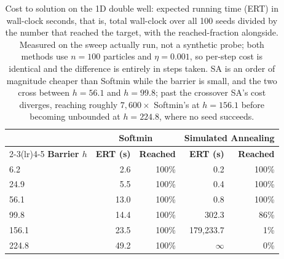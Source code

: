 \documentclass{article} %
\theoremstyle{plain}
\theoremstyle{definition}
\theoremstyle{remark}
\begin{document}
\begin{table}[!htbp]
\centering
\caption{Cost to solution on the 1D double well: expected running time (ERT) in wall-clock seconds, that is, total wall-clock over all 100 seeds divided by the number that reached the target, with the reached-fraction alongside. Measured on the sweep actually run, not a synthetic probe; both methods use $n=100$ particles and $\eta=0.001$, so per-step cost is identical and the difference is entirely in steps taken. SA is an order of magnitude cheaper than Softmin while the barrier is small, and the two cross between $h=56.1$ and $h=99.8$; past the crossover SA's cost diverges, reaching roughly $7{,}600\times$ Softmin's at $h=156.1$ before becoming unbounded at $h=224.8$, where no seed succeeds.}
\label{tab:cost_to_solution}
\begin{tabular}{@{}lrrrr@{}}
\toprule
& \multicolumn{2}{c}{\textbf{Softmin}} & \multicolumn{2}{c}{\textbf{Simulated Annealing}} \\
\cmidrule(lr){2-3}\cmidrule(lr){4-5}
\textbf{Barrier $h$} & \textbf{ERT (s)} & \textbf{Reached} & \textbf{ERT (s)} & \textbf{Reached} \\
\midrule
6.2   & 2.6  & 100\% & 0.2                & 100\% \\
24.9  & 5.5  & 100\% & 0.4                & 100\% \\
56.1  & 13.0 & 100\% & 0.8                & 100\% \\
99.8  & 14.4 & 100\% & 302.3              & 86\%  \\
156.1 & 23.5 & 100\% & 179{,}233.7        & 1\%   \\
224.8 & 49.2 & 100\% & $\infty$           & 0\%   \\
\bottomrule
\end{tabular}
\end{table}
\end{document}
